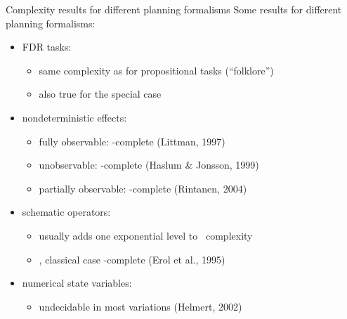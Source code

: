 \documentclass{gkibeamer}
\begin{document}
\begin{frame}{Complexity results for different planning formalisms}
  Some results for different planning formalisms:
  \begin{itemize}
  \item \alert{FDR tasks:}
    \begin{itemize}
    \item same complexity as for propositional tasks (``folklore'')
    \item also true for the {\sasplus} special case
    \end{itemize}
  \item \alert{nondeterministic effects:}
    \begin{itemize}
    \item fully observable: \exptime-complete (Littman, 1997)
    \item unobservable: \expspace-complete (Haslum \& Jonsson, 1999)
    \item partially observable: \dblexptime-complete (Rintanen, 2004)
    \end{itemize}
  \item \alert{schematic operators:}
    \begin{itemize}
    \item usually adds one exponential level to \planex\ complexity
    \item \eg, classical case \expspace-complete (Erol et al., 1995)
    \end{itemize}
  \item \alert{numerical state variables:}
    \begin{itemize}
    \item undecidable in most variations (Helmert, 2002)
    \end{itemize}
  \end{itemize}
\end{frame}
\end{document}
